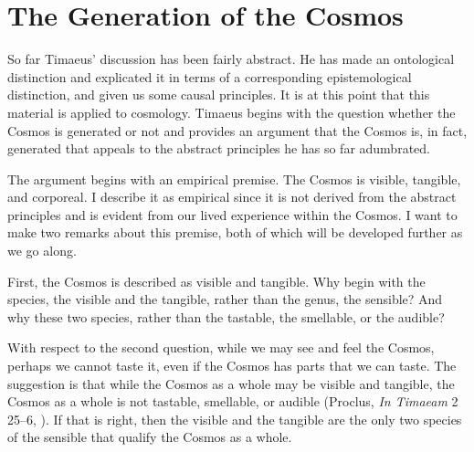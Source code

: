 
\section{The Generation of the Cosmos} %
\label{sec:the_generation_of_the_cosmos}

So far Timaeus' discussion has been fairly abstract. He has made an ontological distinction and explicated it in terms of a corresponding epistemological distinction, and given us some causal principles. It is at this point that this material is applied to cosmology. Timaeus begins with the question whether the Cosmos is generated or not and provides an argument that the Cosmos is, in fact, generated that appeals to the abstract principles he has so far adumbrated.

The argument begins with an empirical premise. The Cosmos is visible, tangible, and corporeal. I describe it as empirical since it is not derived from the abstract principles and is evident from our lived experience within the Cosmos. I want to make two remarks about this premise, both of which will be developed further as we go along.

First, the Cosmos is described as visible and tangible. Why begin with the species, the visible and the tangible, rather than the genus, the sensible? And why these two species, rather than the tastable, the smellable, or the audible? 

With respect to the second question, while we may see and feel the Cosmos, perhaps we cannot taste it, even if the Cosmos has parts that we can taste. The suggestion is that while the Cosmos as a whole may be visible and tangible, the Cosmos as a whole is not tastable, smellable, or audible (Proclus, \emph{In Timaeam} 2 25--6, \citealt{Diehl:1903re}). If that is right, then the visible and the tangible are the only two species of the sensible that qualify the Cosmos as a whole.

